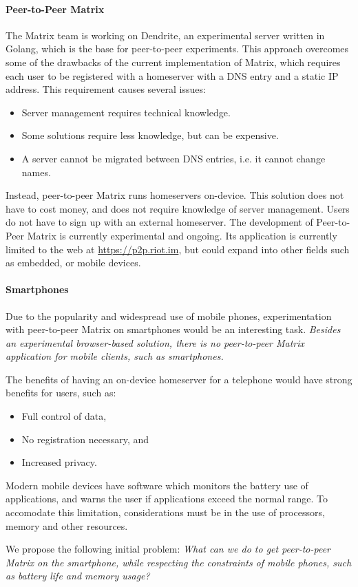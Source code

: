 \paragraph{Peer-to-Peer Matrix}
The Matrix team is working on Dendrite\cite{matrix_org_dendrite}, an experimental server written in Golang, which is the base for peer-to-peer experiments.
This approach overcomes some of the drawbacks of the current implementation of Matrix, which requires each user to be registered with a homeserver with a \ac{DNS} entry and a static IP address.
This requirement causes several issues:
\begin{itemize}
    \item Server management requires technical knowledge.
    \item Some solutions require less knowledge, but can be expensive.
    \item A server cannot be migrated between \ac{DNS} entries, i.e. it cannot change names.
\end{itemize}
Instead, peer-to-peer Matrix runs homeservers on-device.
This solution does not have to cost money, and does not require knowledge of server management.
Users do not have to sign up with an external homeserver.
The development of Peer-to-Peer Matrix is currently experimental and ongoing.
Its application is currently limited to the web at \url{https://p2p.riot.im}, but could expand into other fields such as embedded, or mobile devices.

\paragraph{Smartphones}
Due to the popularity and widespread use of mobile phones, experimentation with peer-to-peer Matrix on smartphones would be an interesting task.
\textit{Besides an experimental browser-based solution\cite{fosdem_event_p2p_matrix}, there is no peer-to-peer Matrix application for mobile clients, such as smartphones.}

The benefits of having an on-device homeserver for a telephone would have strong benefits for users, such as:
\begin{itemize}
    \item Full control of data,
    \item No registration necessary, and
    \item Increased privacy.
\end{itemize}

\noindent
Modern mobile devices have software which monitors the battery use of applications, and warns the user if applications exceed the normal range.
To accomodate this limitation, considerations must be in the use of processors, memory and other resources.

\begin{center}
    We propose the following initial problem: \textit{What can we do to get peer-to-peer Matrix on the smartphone, while respecting the constraints of mobile phones, such as battery life and memory usage?}
\end{center}

